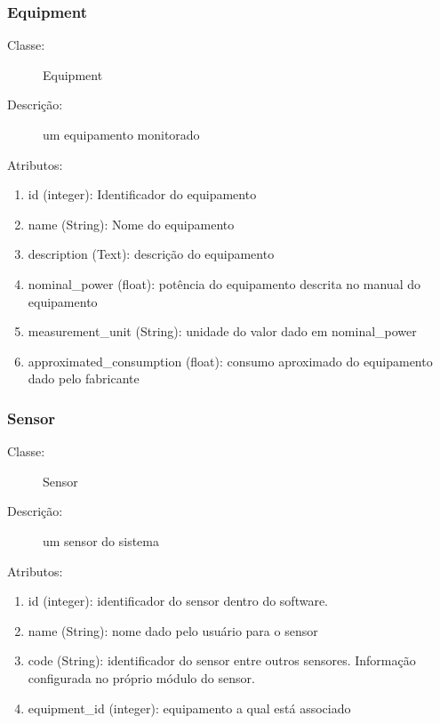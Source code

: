 \subsubsection{Equipment}
\begin{description}
	\item[Classe:] Equipment
	\item[Descrição:] um equipamento monitorado
	\item[Atributos:]
\end{description} 
\begin{enumerate}
  \item id (integer): Identificador do equipamento
  \item name (String): Nome do equipamento
  \item description (Text): descrição do equipamento 
  \item nominal\_power (float): potência do equipamento descrita no manual do equipamento 
  \item measurement\_unit (String): unidade do valor dado em nominal\_power
  \item approximated\_consumption (float): consumo aproximado do equipamento dado pelo fabricante 
\end{enumerate}
%
\subsubsection{Sensor}
\begin{description}
	\item[Classe:] Sensor
	\item[Descrição:] um sensor do sistema
	\item[Atributos:]
\end{description} 
\begin{enumerate}
	\item id (integer): identificador do sensor dentro do software.
	\item name (String): nome dado pelo usuário para o sensor
	\item code (String): identificador do sensor entre outros sensores. Informação configurada no próprio módulo do sensor.
	\item equipment\_id (integer): equipamento a qual está associado
\end{enumerate}
%
